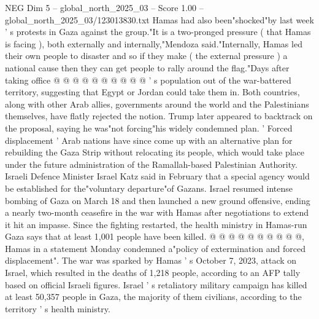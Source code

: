 \begin{textsample}{NEG Dim 5 – global\_north\_2025\_03 – Score 1.00 – global\_north\_2025\_03/123013830.txt}
Hamas had also been"shocked"by last week ' s protests in Gaza against the group."It is a two-pronged pressure ( that Hamas is facing ), both externally and internally,"Mendoza said."Internally, Hamas led their own people to disaster and so if they make ( the external pressure ) a national cause then they can get people to rally around the flag."Days after taking office @ @ @ @ @ @ @ @ @ @ ' s population out of the war-battered territory, suggesting that Egypt or Jordan could take them in.
Both countries, along with other Arab allies, governments around the world and the Palestinians themselves, have flatly rejected the notion.
Trump later appeared to backtrack on the proposal, saying he was"not forcing"his widely condemned plan. ' Forced displacement ' Arab nations have since come up with an alternative plan for rebuilding the Gaza Strip without relocating its people, which would take place under the future administration of the Ramallah-based Palestinian Authority.
Israeli Defence Minister Israel Katz said in February that a special agency would be established for the"voluntary departure"of Gazans.
Israel resumed intense bombing of Gaza on March 18 and then launched a new ground offensive, ending a nearly two-month ceasefire in the war with Hamas after negotiations to extend it hit an impasse.
Since the fighting restarted, the health ministry in Hamas-run Gaza says that at least 1,001 people have been killed. @ @ @ @ @ @ @ @ @ @, Hamas in a statement Monday condemned a"policy of extermination and forced displacement".
The war was sparked by Hamas ' s October 7, 2023, attack on Israel, which resulted in the deaths of 1,218 people, according to an AFP tally based on official Israeli figures.
Israel ' s retaliatory military campaign has killed at least 50,357 people in Gaza, the majority of them civilians, according to the territory ' s health ministry.

\end{textsample}
